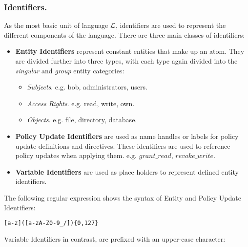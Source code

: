 \documentclass[11pt]{llncs}
\begin{document}
      \subsubsection{Identifiers.}

        As the most basic unit of language ${\cal L}$, identifiers are used to
        represent the different components of the language. There are three
        main classes of identifiers:

        \begin{itemize}
          \item
            {\bf Entity Identifiers} represent constant entities that make
            up an atom. They are divided further into three types, with each
            type again divided into the {\em singular} and {\em group} entity
            categories:

            \begin{itemize}
              \item
                {\em Subjects}. e.g. bob, administrators, users.
              \item
                {\em Access Rights}. e.g. read, write, own.
              \item
                {\em Objects}. e.g. file, directory, database.
            \end{itemize}
          \vspace{1mm}
          \item
            {\bf Policy Update Identifiers} are used as name handles or labels
            for policy update definitions and directives. These identifiers are
            used to reference policy updates when applying them. e.g.
            $grant\_read$, $revoke\_write$.

          \vspace{1mm}
          \item
            {\bf Variable Identifiers} are used as place holders to represent
            defined entity identifiers.
        \end{itemize}

        The following regular expression shows the syntax of Entity and
        Policy Update Identifiers:

        \begin{verbatim}[a-z]([a-zA-Z0-9_/]){0,127}\end{verbatim}

        Variable Identifiers in contrast, are prefixed with an upper-case
        character:
\end{document}
